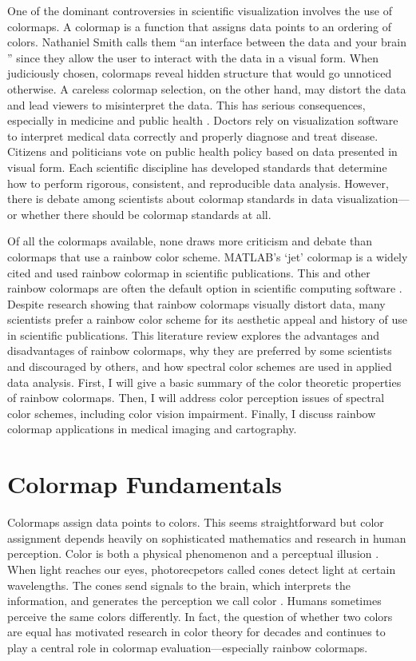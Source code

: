 \documentclass[journal,12pt]{IEEEtran}
\begin{document}
One of the dominant controversies in scientific visualization involves the use of colormaps.
A colormap is a function that assigns data points to
an ordering of colors. Nathaniel Smith
calls them ``an interface between the data and your
brain \cite{viridis}'' since they allow the user to interact with the data in a visual form.
When judiciously chosen, colormaps reveal hidden structure that would go unnoticed
otherwise. A careless colormap selection, on the other hand, may distort the data and
lead viewers to misinterpret the data. This has
serious consequences, especially in medicine and public health \cite{arteryvis,choropleth}.
Doctors rely on visualization software to interpret medical
data correctly and properly diagnose and treat disease.
Citizens and politicians vote on public health policy based on data presented 
in visual form. Each scientific discipline has developed standards that determine
how to perform rigorous, consistent, and reproducible data analysis. However,
there is debate among scientists about colormap standards in data visualization---or
whether there should be colormap standards at all.

Of all the colormaps available, none draws more criticism and debate than colormaps that use a rainbow
color scheme. MATLAB's `jet' colormap is a widely cited and used rainbow colormap in 
scientific publications. This and other rainbow
colormaps are often the default option in scientific computing software \cite{viridis,matlab}.
Despite research showing that rainbow colormaps visually distort data, many scientists
prefer a rainbow color scheme for its aesthetic appeal
and history of use in scientific publications. This literature
review explores the advantages and disadvantages
of rainbow colormaps, why they are preferred by some
scientists and discouraged by others, and how spectral color schemes are used
in applied data analysis. First, I will give a basic summary 
of the color theoretic properties of rainbow colormaps. Then, I will
address color perception issues of spectral color schemes, including
color vision impairment. Finally, I discuss rainbow colormap applications
in medical imaging and cartography.

\section{Colormap Fundamentals}

Colormaps assign data points to colors. This seems straightforward but color assignment
depends heavily on sophisticated mathematics and research in human perception. 
Color is both a physical phenomenon and a perceptual illusion \cite{endofrainbow}.
When light reaches our eyes, photorecpetors called cones detect light at certain wavelengths.
The cones send signals to the brain, which interprets the information,
and generates the perception we call color \cite{viridis}. Humans sometimes perceive the same
colors differently. In fact, the question of whether two colors are equal has motivated
research in color theory for decades and continues to play a central role in colormap 
evaluation---especially rainbow colormaps.
\end{document}
